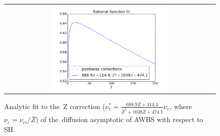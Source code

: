 \documentclass[preprint,12pt]{elsarticle}
\newcommand{\Zbar}{\bar{Z}}
\newcommand{\nue}{\nu_{e}}
\newcommand{\nuei}{\nu_{ei}}
\begin{document}
\begin{figure}[tbh]
  \begin{center}
    \begin{tabular}{c}
      \includegraphics[width=0.55\textwidth]{../results/fe_analysis/figs/AWBScorrection_fit.png} 
    \end{tabular}
  \caption{
  Analytic fit to the~Z correction 
  ($\nue^* = \frac{688.9 \Zbar + 114.4}{\Zbar^2 + 
  1038 \Zbar + 474.1} \nue$, where $\nue = \nuei / \Zbar$) 
  of the~diffusion asymptotic of AWBS with respect to SH.
  }
  \end{center}
  \label{fig:AWBScorrection_f1}
\end{figure}
\end{document}
